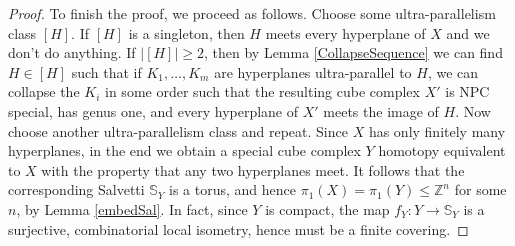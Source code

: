 \documentclass[11pt]{amsart}
\numberwithin{thm}{section}
\newtheorem{lemma}[thm]{Lemma}
\theoremstyle{remark}
\theoremstyle{definition}
\newcommand{\overl}[1]{\overline{#1}}
\newcommand{\Z}{\mathbb{Z}}
\newcommand{\Sa}{\mathbb{S}}
\begin{document}
\begin{proof}
To finish the proof, we proceed as follows.  Choose some ultra-parallelism class $[H]$. If $[H]$ is a singleton, then $H$ meets every hyperplane of $X$ and we don't do anything.  If $|[H]|\geq 2$, then by Lemma \ref{CollapseSequence} we can find $H\in [H]$ such that if $K_1,\ldots, K_m$ are hyperplanes ultra-parallel to $H$, we can collapse the $K_i$ in some order such that the resulting cube complex $X'$ is NPC special, has genus one, and every hyperplane of $X'$ meets the image of $H$.  Now choose another ultra-parallelism class and repeat.  Since $X$ has only finitely many hyperplanes, in the end we obtain a special cube complex $Y$ homotopy equivalent to $X$ with the property that any two hyperplanes meet.  It follows that the corresponding Salvetti $\Sa_Y$ is a torus, and hence $\pi_1(X)=\pi_1(Y)\leq \Z^n$ for some $n$, by Lemma \ref{embedSal}.  In fact, since $Y$ is compact, the map $f_Y:Y\rightarrow \Sa_Y$ is a surjective, combinatorial local isometry, hence must be a finite covering. 
%
%
%
%
%

\end{proof}
\end{document}
